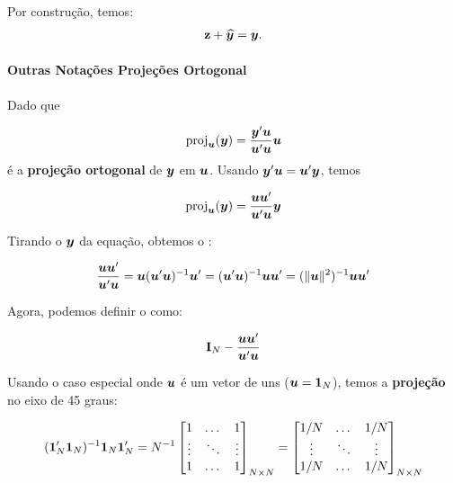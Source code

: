 \documentclass[11pt, oneside, a4paper, article]{article}
\numberwithin{equation}{section}
\begin{document}
\begin{description}
Por construção, temos:
\vspace{-1 em}
\begin{align*}
	\mathbf{z} + \widehat{\boldsymbol{y}} = \boldsymbol{y}.
\end{align*}


\paragraph{Outras Notações Projeções Ortogonal}
Dado que

\vspace{-1 em}
\begin{align*}
	\text{proj}_{\boldsymbol{u}}(\boldsymbol{y}) =
	\frac{\boldsymbol{y}' \boldsymbol{u}}{\boldsymbol{u}'\boldsymbol{u}} \boldsymbol{u}
\end{align*}
é a \textbf{projeção ortogonal} de $\boldsymbol{y}$ em $\boldsymbol{u}$.
Usando $\boldsymbol{y}'\boldsymbol{u} = \boldsymbol{u}'\boldsymbol{y}$, temos

\vspace{-1 em}
\begin{align*}
	\text{proj}_{\boldsymbol{u}}(\boldsymbol{y}) =
	\frac{\boldsymbol{u} \boldsymbol{u}'}{\boldsymbol{u}'\boldsymbol{u}} \boldsymbol{y}
\end{align*}

\noindent
Tirando o $\boldsymbol{y}$ da equação, obtemos o  :

\vspace{-1 em}
\begin{align*}
	\frac{\boldsymbol{u} \boldsymbol{u}'}{\boldsymbol{u}'\boldsymbol{u}} 
	=
	\boldsymbol{u}(\boldsymbol{u}'\boldsymbol{u})^{-1} \boldsymbol{u}'
	=
	(\boldsymbol{u}'\boldsymbol{u})^{-1} \boldsymbol{u} \boldsymbol{u}'
	=
	(\|\boldsymbol{u} \|^2)^{-1} \boldsymbol{u} \boldsymbol{u}'
\end{align*}

Agora, podemos definir o  como:

\vspace{-1 em}
\begin{align*}
	\mathbf{I}_{N} - \frac{\boldsymbol{u} \boldsymbol{u}'}{\boldsymbol{u}'\boldsymbol{u}} 
\end{align*}

Usando o caso especial onde $\boldsymbol{u}$ é um vetor de uns ($\boldsymbol{u} = \boldsymbol{1}_{N}$), temos a \textbf{projeção} no eixo de 45 graus:

\vspace{-1 em}
\begin{align*}
	( \boldsymbol{1}_{N}' \boldsymbol{1}_{N} )^{-1} \boldsymbol{1}_{N} \boldsymbol{1}_{N}'
	=
	N^{-1} 
	\begin{bmatrix}
		1      & \dots  & 1	 \\
		\vdots & \ddots & \vdots \\
		1      & \dots  & 1	
	\end{bmatrix}_{N \times N}
	=
	\begin{bmatrix}
		1/N    & \dots  & 1/N	 \\
		\vdots & \ddots & \vdots \\
		1/N    & \dots  & 1/N	
	\end{bmatrix}_{N \times N}
\end{align*}


\end{description}
\end{document}
